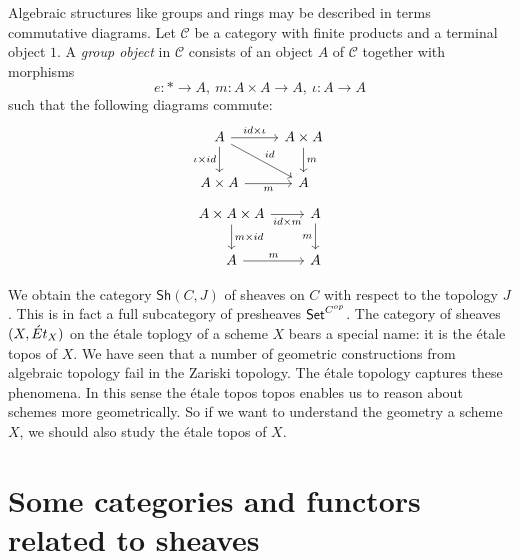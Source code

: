 \begin{definition}
Algebraic structures like groups and rings may be described in terms commutative diagrams. Let $\mathcal{C}$ be a category with finite products and a terminal object $1$. A \textit{group object} in $\mathcal{C}$ consists of an object $A$ of $\mathcal{C}$ together with morphisms
\[e: * \to A,\ m : A \times A \to A,\ \iota: A \to A \]
such that the following diagrams commute:
\[
	\begin{tikzcd}
		A & {A \times A} \\
		{A \times A} & A
		\arrow["{\iota \times id}"', from=1-1, to=2-1]
		\arrow["{id \times \iota}", from=1-1, to=1-2]
		\arrow["m", from=1-2, to=2-2]
		\arrow["m"', from=2-1, to=2-2]
		\arrow["id", from=1-1, to=2-2]
	\end{tikzcd}
\]
\[
	\begin{tikzcd}
		{A \times A \times A} & A \\
		A & A
		\arrow["{id \times m}"', from=1-1, to=1-2]
		\arrow["m"', from=1-2, to=2-2]
		\arrow["{m \times id}", from=1-1, to=2-1]
		\arrow["m", from=2-1, to=2-2]
	\end{tikzcd}
\]
\end{definition}

We obtain the category $\mathsf{Sh}(C,J)$ of sheaves on $C$ with respect to the topology $J$. This is in fact a full subcategory of presheaves $\mathsf{Set}^{C^{op}}$. The category of sheaves $\mathcal{(}X, \acute{E}t_X)$ on the \'etale toplogy of a scheme $X$ bears a special name: it is the \'etale topos of $X$. We have seen that a number of geometric constructions from algebraic topology fail in the Zariski topology. The \'etale topology captures these phenomena. In this sense the \'etale topos topos enables us to reason about schemes more geometrically. So if we want to understand the geometry a scheme $X$, we should also study the \'etale topos of $X$.

\section{Some categories and functors related to sheaves}

